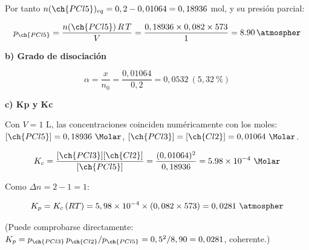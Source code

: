 \begin{exerciseEVAU}
\begin{solu}
        Por tanto \(n(\ch{PCl5})_{eq} = 0,2 - 0,01064 = 0,18936\) mol, y su presión parcial:

        \begin{equation*}
            p_{\ch{PCl5}} = \dfrac{n(\ch{PCl5})\, R\, T}{V} = \dfrac{0,18936 \times 0,082 \times 573}{1} = \SI{8.90}{\atmospher}
        \end{equation*}

        \textbf{b) Grado de disociación}

        \begin{equation*}
            \alpha = \dfrac{x}{n_0} = \dfrac{0,01064}{0,2} = 0,0532 \ (5,32\ \%)
        \end{equation*}

        \textbf{c) Kp y Kc}

        Con \(V=1\) L, las concentraciones coinciden numéricamente con los moles: \([\ch{PCl5}] = 0,18936\ \si{\Molar}\), \([\ch{PCl3}] = [\ch{Cl2}] = 0,01064\ \si{\Molar}\).

        \begin{equation*}
            K_c = \dfrac{[\ch{PCl3}][\ch{Cl2}]}{[\ch{PCl5}]} = \dfrac{(0,01064)^2}{0,18936} = \num{5.98e-4} \ \si{\Molar}
        \end{equation*}

        Como \(\Delta n = 2 - 1 = 1\):

        \begin{equation*}
            K_p = K_c\, (R T) = 5,98 \times 10^{-4} \times (0,082 \times 573) = 0,0281 \ \si{\atmospher}
        \end{equation*}

        (Puede comprobarse directamente: \(K_p = p_{\ch{PCl3}}\, p_{\ch{Cl2}} / p_{\ch{PCl5}} = 0,5^2/8,90 = 0,0281\), coherente.)

    \end{solu}
\end{exerciseEVAU}

